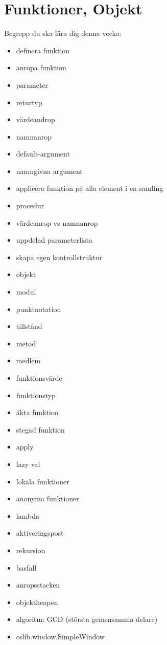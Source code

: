 \chapter{Funktioner, Objekt}\label{chapter:W03}
Begrepp du ska lära dig denna vecka:
\begin{multicols}{2}\begin{itemize}[nosep,label={$\square$},leftmargin=*]
\item definera funktion
\item anropa funktion
\item parameter
\item returtyp
\item värdeandrop
\item namnanrop
\item default-argument
\item namngivna argument
\item applicera funktion på alla element i en samling
\item procedur
\item värdeanrop vs namnanrop
\item uppdelad parameterlista
\item skapa egen kontrollstruktur
\item objekt
\item modul
\item punktnotation
\item tillstånd
\item metod
\item medlem
\item funktionsvärde
\item funktionstyp
\item äkta funktion
\item stegad funktion
\item apply
\item lazy val
\item lokala funktioner
\item anonyma funktioner
\item lambda
\item aktiveringspost
\item rekursion
\item basfall
\item anropsstacken
\item objektheapen
\item algoritm: GCD (största gemensamma delare)
\item cslib.window.SimpleWindow\end{itemize}\end{multicols}
